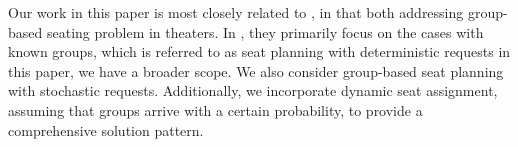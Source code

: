



Our work in this paper is most closely related to \cite{blom2022filling}, in that both addressing group-based seating problem in theaters. In \cite{blom2022filling}, they primarily focus on the cases with known groups, which is referred to as seat planning with deterministic requests in this paper, we have a broader scope. We also consider group-based seat planning with stochastic requests. Additionally, we incorporate dynamic seat assignment, assuming that groups arrive with a certain probability, to provide a comprehensive solution pattern.





